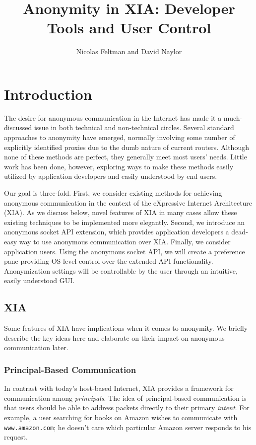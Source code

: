 \documentclass[11pt]{article}
\title{Anonymity in XIA: Developer Tools and User Control}
\author{Nicolas Feltman and David Naylor}
\date{}
\begin{document}
\maketitle
\section{Introduction}
The desire for anonymous communication in the Internet has made it a much-discussed issue in both technical and non-technical circles. Several standard approaches to anonymity have emerged, normally involving some number of explicitly identified proxies  due to the dumb nature of current routers. Although none of these methods are perfect, they generally meet most users' needs. Little work has been done, however, exploring ways to make these methods easily utilized by application developers and easily understood by end users.

Our goal is three-fold. First, we consider existing methods for achieving anonymous communication in the context of the eXpressive Internet Architecture (XIA). As we discuss below, novel features of XIA in many cases allow these existing techniques to be implemented more elegantly. Second, we introduce an anonymous socket API extension, which provides application developers a dead-easy way to use anonymous communication over XIA. Finally, we consider application users. Using the anonymous socket API, we will create a preference pane providing OS level control over the extended API functionality. Anonymization settings will be controllable by the user through an intuitive, easily understood GUI.

\subsection{XIA}
Some features of XIA have implications when it comes to anonymity. We briefly describe the key ideas here and elaborate on their impact on anonymous communication later.
\subsubsection{Principal-Based Communication}
In contrast with today's host-based Internet, XIA provides a framework for communication among \emph{principals}. The idea of principal-based communication is that users should be able to address packets directly to their primary \emph{intent}. For example, a user searching for books on Amazon wishes to communicate with \texttt{www.amazon.com}; he doesn't care which particular Amazon server responds to his request.
\end{document}
